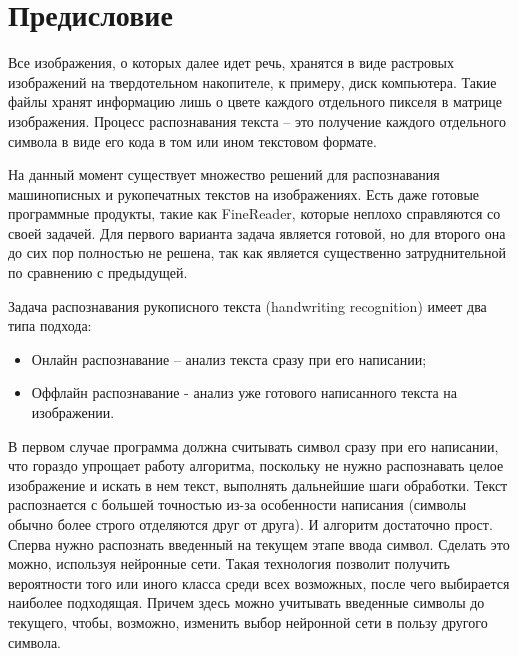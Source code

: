 \chapter*{Предисловие} %


Все изображения, о которых далее идет речь, хранятся в виде растровых изображений на твердотельном накопителе, к примеру, диск компьютера. Такие файлы хранят информацию лишь о цвете каждого отдельного пикселя в матрице изображения. Процесс распознавания текста – это получение каждого отдельного символа в виде его кода в том или ином текстовом формате.

На данный момент существует множество решений для распознавания машинописных и рукопечатных текстов на изображениях. Есть даже готовые программные продукты, такие как FineReader, которые неплохо справляются со своей задачей. Для первого варианта задача является готовой, но для второго она до сих пор полностью не решена, так как является существенно затруднительной по сравнению с предыдущей.

Задача распознавания рукописного текста (handwriting recognition) имеет два типа подхода:
\begin{itemize}
	\item 	Онлайн распознавание – анализ текста сразу при его написании;
	\item Оффлайн распознавание - анализ уже готового написанного текста на изображении.
\end{itemize}

В первом случае программа должна считывать символ сразу при его написании, что гораздо упрощает работу алгоритма, поскольку не нужно распознавать целое изображение и искать в нем текст, выполнять дальнейшие шаги обработки. Текст распознается с большей точностью из-за особенности написания (символы обычно более строго отделяются друг от друга). И алгоритм достаточно прост. Сперва нужно распознать введенный на текущем этапе ввода символ. Сделать это можно, используя нейронные сети. Такая технология позволит получить вероятности того или иного класса среди всех возможных, после чего выбирается наиболее подходящая. Причем здесь можно учитывать введенные символы до текущего, чтобы, возможно, изменить выбор нейронной сети в пользу другого символа. 

